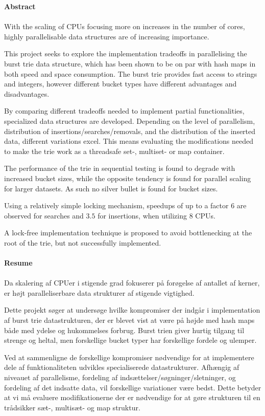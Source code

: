 \noindent
{\bf Abstract}
\\\\
With the scaling of CPUs focusing more on increases in the number of cores,
highly parallelisable data structures are of increasing importance.

This project seeks to explore the implementation tradeoffs in parallelising the
burst trie data structure, which has been shown to be on par with hash maps in
both speed and space consumption. The burst trie provides fast access to
strings and integers, however different bucket types have different advantages
and disadvantages.

By comparing different tradeoffs needed to implement partial functionalities,
specialized data structures are developed. Depending on the level of
parallelism, distribution of insertions/searches/removals, and the
distribution of the inserted data, different variations excel. This means
evaluating the modifications needed to make the trie work as a threadsafe set-,
multiset- or map container.

The performance of the trie in sequential testing is found to degrade with
increased bucket sizes, while the opposite tendency is found for parallel
scaling for larger datasets. As such no silver bullet is found for bucket
sizes.

Using a relatively simple locking mechanism, speedups of up to a factor $6$ are
observed for searches and $3.5$ for insertions, when utilizing 8 CPUs.

A lock-free implementation technique is proposed to avoid bottlenecking at the
root of the trie, but not successfully implemented.
\\\\
{\bf Resume}
\\\\
Da skalering af CPUer i stigende grad fokuserer på forøgelse af antallet af
kerner, er højt paralleliserbare data strukturer af stigende vigtighed.

Dette projekt søger at undersøge hvilke kompromiser der indgår i implementation
af burst trie datastrukturen, der er blevet vist at være på højde med hash maps
både med ydelse og hukommelses forbrug. Burst trien giver hurtig tilgang til
strenge og heltal, men forskellige bucket typer har forskellige fordele og ulemper.

Ved at sammenligne de forskellige kompromiser nødvendige for at implementere dele
af funktionaliteten udvikles specialiserede datastrukturer. Afhængig af niveauet
af parallelisme, fordeling af indsættelser/søgninger/sletninger, og fordeling
af det indsatte data, vil forskellige variationer være bedst. Dette betyder at
vi må evaluere modifikationerne der er nødvendige for at gøre strukturen til
en trådsikker sæt-, multisæt- og map struktur.

